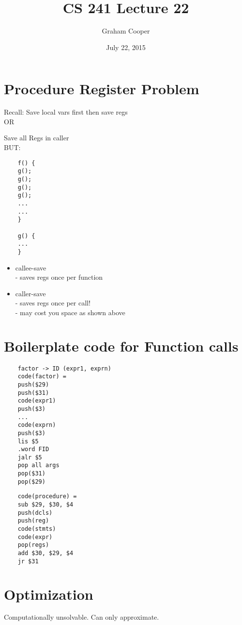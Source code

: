 \documentclass[12pt]{article}
\title{\vspace{-15ex}CS 241 Lecture 22\vspace{-1ex}}
\date{July 22, 2015}
\author{Graham Cooper}
\begin{document}
	\maketitle
	
	\section*{Procedure Register Problem}
	Recall: Save local vars first then save regs\\
	
	OR 
	
	Save all Regs in caller\\
	BUT:\\
	\begin{verbatim}
	f() {
	g();
	g();
	g();
	g();
	...
	...
	}
	
	g() {
	...
	}
	\end{verbatim}
	
	\begin{itemize}
		\item callee-save\\
		- saves regs once per function
		\item caller-save\\
		- saves regs once per call!\\
		- may cost you space as shown above\\
	\end{itemize}
	
	\section*{Boilerplate code for Function calls}
	\begin{verbatim}
	factor -> ID (expr1, exprn)
	code(factor) = 
	push($29)
	push($31)
	code(expr1)
	push($3)
	...
	code(exprn)
	push($3)
	lis $5
	.word FID
	jalr $5
	pop all args
	pop($31)
	pop($29)
	\end{verbatim}
	
	\begin{verbatim}
	code(procedure) = 
	sub $29, $30, $4
	push(dcls)
	push(reg)
	code(stmts)
	code(expr)
	pop(regs)
	add $30, $29, $4
	jr $31
	\end{verbatim}
	
	\section*{Optimization}
	Computationally unsolvable. Can only approximate.\\
	
\end{document}
